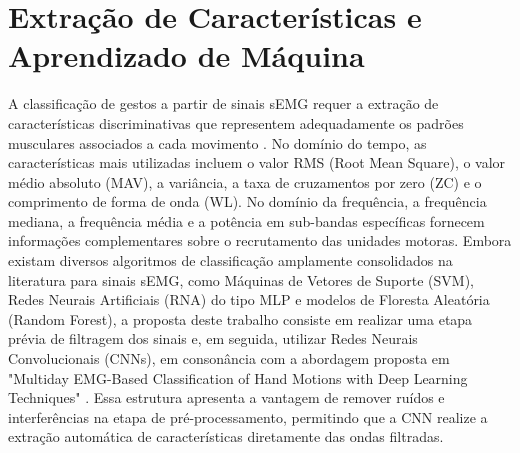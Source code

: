 \section{Extração de Características e Aprendizado de Máquina}
A classificação de gestos a partir de sinais sEMG requer a extração de características discriminativas que representem adequadamente os padrões musculares associados a cada movimento \cite{Castro}. No domínio do tempo, as características mais utilizadas incluem o valor RMS (Root Mean Square), o valor médio absoluto (MAV), a variância, a taxa de cruzamentos por zero (ZC) e o comprimento de forma de onda (WL). No domínio da frequência, a frequência mediana, a frequência média e a potência em sub-bandas específicas fornecem informações complementares sobre o recrutamento das unidades motoras.
Embora existam diversos algoritmos de classificação amplamente consolidados na literatura para sinais sEMG, como Máquinas de Vetores de Suporte (SVM), Redes Neurais Artificiais (RNA) do tipo MLP e modelos de Floresta Aleatória (Random Forest), a proposta deste trabalho consiste em realizar uma etapa prévia de filtragem dos sinais e, em seguida, utilizar Redes Neurais Convolucionais (CNNs), em consonância com a abordagem proposta em "Multiday EMG-Based Classification of Hand Motions with Deep Learning Techniques"  \cite{Rehman} . Essa estrutura apresenta a vantagem de remover ruídos e interferências na etapa de pré-processamento, permitindo que a CNN realize a extração automática de características diretamente das ondas filtradas.
